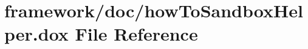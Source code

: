 \hypertarget{how_to_sandbox_helper_8dox}{}\section{framework/doc/how\+To\+Sandbox\+Helper.dox File Reference}
\label{how_to_sandbox_helper_8dox}
